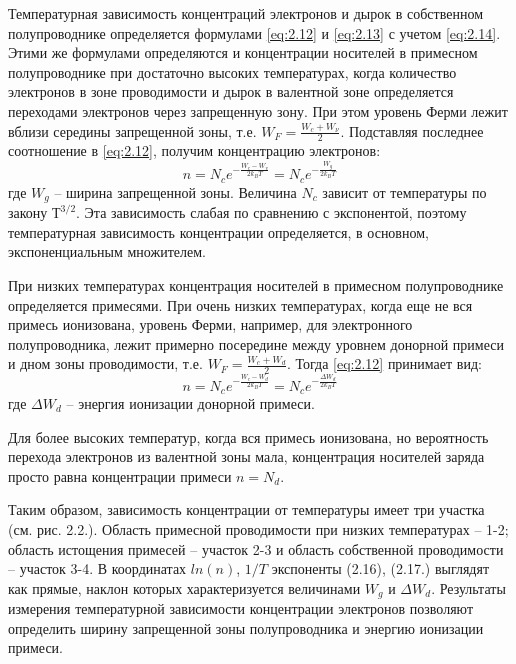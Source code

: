 Температурная зависимость концентраций электронов и дырок в собственном полупроводнике определяется формулами \eqref{eq:2.12} и \eqref{eq:2.13} с учетом
\eqref{eq:2.14}. Этими же формулами определяются и концентрации носителей в примесном полупроводнике при достаточно высоких
температурах, когда количество электронов в зоне проводимости и дырок в валентной зоне определяется переходами
электронов через запрещенную зону. При этом уровень Ферми лежит вблизи середины запрещенной зоны, т.е. $W_F =
\frac{W_c+W_{\nu}}{2}$. Подставляя последнее соотношение в \eqref{eq:2.12}, получим концентрацию электронов:
\begin{equation}
	n=N_{c} e^{-\frac{W_{c}-W_{v}}{2 k_{B} T}}=N_{c} e^{-\frac{W_{g}}{2 k_{B} T}}
	\label{eq:2.16}
\end{equation}
где $W_g$  – ширина запрещенной зоны. Величина $N_c$ зависит от температуры по закону $Т^{3/2}$. Эта зависимость слабая по
сравнению с экспонентой, поэтому температурная зависимость концентрации определяется, в основном, экспоненциальным
множителем. 

При низких температурах концентрация носителей в примесном полупроводнике определяется примесями. При очень низких
температурах, когда еще не вся примесь ионизована, уровень Ферми, например, для электронного полупроводника, лежит
примерно посередине между уровнем донорной примеси и дном зоны проводимости, т.е. $W_F = \frac{W_c+W_{d}}{2}$. Тогда \eqref{eq:2.12}
принимает вид: 
\begin{equation}
	n=N_{c} e^{-\frac{W_{c}-W_{d}}{2 k_{B} T}}=N_{c} e^{-\frac{\Delta W_{d}}{2 k_{B} T}}
	\label{eq:2.17}
\end{equation}
где $\Delta W_d$ – энергия ионизации донорной примеси. 


Для более высоких температур, когда вся примесь ионизована, но вероятность перехода электронов из валентной зоны мала,
концентрация носителей заряда просто равна концентрации примеси $n=N_d$. 

Таким образом, зависимость концентрации от температуры имеет три участка (см. рис. 2.2.). Область примесной проводимости
при низких температурах – 1-2; область истощения примесей – участок 2-3 и область собственной проводимости – участок
3-4. В координатах $ln(n)$, $1/T$ экспоненты (2.16), (2.17.) выглядят как прямые, наклон которых характеризуется величинами
$W_g$ и $\Delta W_d$. Результаты измерения температурной зависимости концентрации электронов позволяют определить ширину
запрещенной зоны полупроводника и энергию ионизации примеси.

